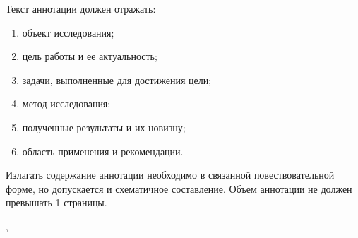 \begin{par}
Текст аннотации должен отражать:
    \begin{enumerate}
    	\item объект исследования;
    	\item цель работы и ее актуальность;
        \item задачи, выполненные для достижения цели; 
    	\item метод исследования;
    	\item полученные результаты и их новизну;
    	\item область применения и рекомендации.
    \end{enumerate}

Излагать содержание аннотации необходимо в связанной повествовательной форме, но допускается и схематичное составление. Объем аннотации не должен превышать 1 страницы.

\begin{flushleft}
    \vspace{1.02cm}
	\vfill
	\student, \\ %
	\readydate\space\currentyear
\end{flushleft}

\end{par}